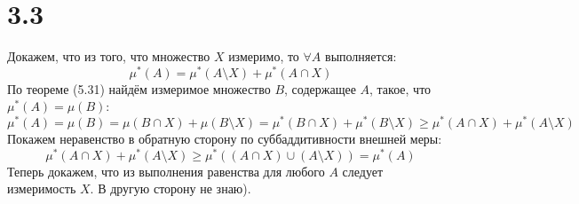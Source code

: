 \documentclass[12pt]{article}
\begin{document}
\section{3.3}
Докажем, что из того, что множество $X$ измеримо, то $\forall A$ выполняется: 
\[
    \mu^{\ast}(A) = \mu^{\ast}(A \setminus X) + \mu^{\ast} (A \cap X)
\]
По теореме (5.31) найдём измеримое множество $B$, 
содержащее $A$, такое, что $\mu^{\ast}(A) = \mu(B)$: 
\[
    \mu^{\ast}(A) = \mu(B) = \mu(B \cap X) + \mu(B \setminus X) = 
    \mu^{\ast} (B \cap X) + \mu^{\ast} (B \setminus X) \geq 
    \mu^{\ast} (A \cap X) + \mu ^{\ast} (A \setminus X) 
\]
Покажем неравенство в обратную сторону по суббаддитивности внешней меры: 
\[
    \mu^{\ast} (A \cap X) + \mu ^{\ast} (A \setminus X) \geq \mu^{\ast}\left( (A \cap X) \cup (A \setminus X) \right) = 
    \mu^{\ast} (A)
\]
Теперь докажем, что из выполнения равенства для любого $A$ следует измеримость $X$.
В другую сторону не знаю). 
\end{document}
